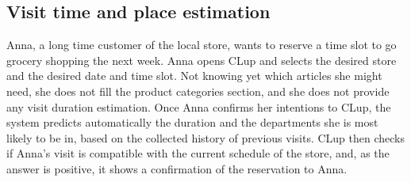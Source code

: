 \documentclass[../../main.tex]{subfiles}
\begin{document}
    \subsection{Visit time and place estimation}

    Anna, a long time customer of the local store, wants to reserve a time slot to go grocery shopping the next week. 
    Anna opens CLup and selects the desired store and the desired date and time slot. 
    Not knowing yet which articles she might need, she does not fill the product categories section, 
    and she does not provide any visit duration estimation. Once Anna confirms her intentions to CLup, 
    the system predicts automatically the duration and the departments she is most likely to be in, 
    based on the collected history of previous visits. CLup then checks if Anna's visit is compatible with the 
    current schedule of the store, and, as the answer is positive, it shows a confirmation of the reservation to Anna.
\end{document}
